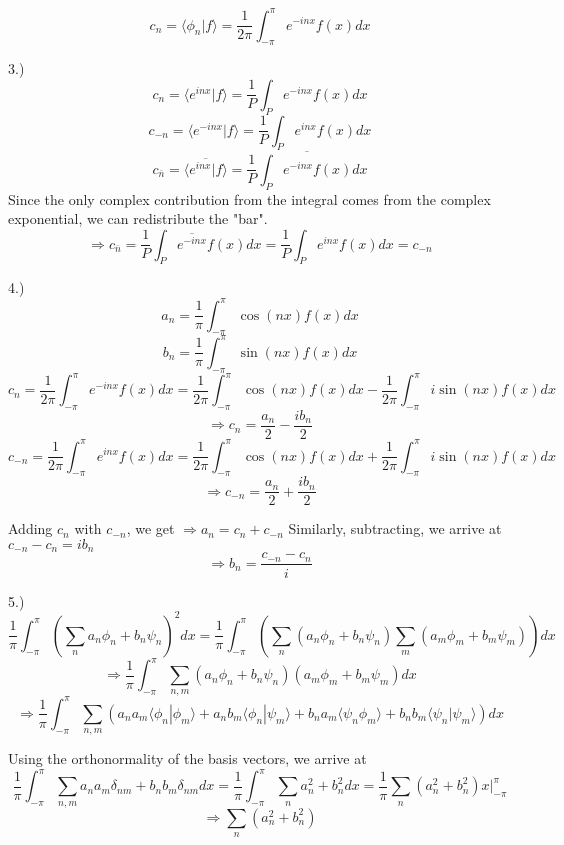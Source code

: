 \documentclass[12pt]{article}
\begin{document}
$$c_n = \langle \phi_n | f \rangle = \frac{1}{2\pi} \int_{-\pi}^{\pi} e^{-inx} f(x) dx$$
\pagebreak

3.)
$$c_n = \langle e^{inx} | f \rangle = \frac{1}{P} \int_P e^{-inx} f(x) dx$$
$$c_{-n} = \langle e^{-inx} | f \rangle = \frac{1}{P} \int_P e^{inx} f(x) dx$$
$$c_{\bar{n}} = \overline{\langle e^{inx} | f \rangle} = \overline{\frac{1}{P} \int_P e^{-inx} f(x) dx}$$
Since the only complex contribution from the integral comes from the complex exponential, we can redistribute the "bar".
$$\Rightarrow c_{\bar n} = \frac{1}{P} \int_{P} \overline{e^{-inx}} f(x) dx = \frac{1}{P} \int_P e^{inx} f(x) dx = c_{-n}$$
\pagebreak

4.) 
$$a_n = \frac{1}{\pi} \int_{-\pi}^{\pi} \cos(nx) f(x) dx$$
$$b_n = \frac{1}{\pi} \int_{-\pi}^{\pi} \sin(nx) f(x) dx$$
$$c_n = \frac{1}{2\pi} \int_{-\pi}^{\pi} e^{-inx} f(x) dx = \frac{1}{2\pi}\int_{-\pi}^{\pi} \cos(nx) f(x) dx - \frac{1}{2\pi} \int_{-\pi}^{\pi} i \sin(nx) f(x) dx$$
$$\Rightarrow c_n = \frac{a_n}{2} - \frac{i b_n}{2}$$
$$c_{-n} = \frac{1}{2\pi} \int_{-\pi}^{\pi} e^{inx} f(x) dx = \frac{1}{2\pi}\int_{-\pi}^{\pi} \cos(nx) f(x) dx + \frac{1}{2\pi} \int_{-\pi}^{\pi} i \sin(nx) f(x) dx$$
$$\Rightarrow c_{-n} = \frac{a_n}{2} + \frac{i b_n}{2}$$

Adding $c_n$ with $c_{-n}$, we get $\Rightarrow a_n = c_n + c_{-n}$
Similarly, subtracting, we arrive at $c_{-n} - c_n = ib_n$
$$\Rightarrow b_n = \frac{c_{-n} - c_n}{i}$$

\pagebreak

5.) 
$$\frac{1}{\pi}\int_{-\pi}^{\pi}(\sum_n a_n \phi_n + b_n \psi_n)^2 dx = \frac{1}{\pi} \int_{-\pi}^{\pi} (\sum_n (a_n \phi_n + b_n \psi_n) \sum_m (a_m \phi_m + b_m \psi_m)) dx$$
$$\Rightarrow \frac{1}{\pi} \int_{-\pi}^{\pi} \sum_{n, m} (a_n \phi_n + b_n \psi_n) (a_m \phi_m + b_m \psi_m) dx $$
$$\Rightarrow \frac{1}{\pi} \int_{-\pi}^{\pi} \sum_{n, m} (a_n a_m \langle \phi_n | \phi_m \rangle + a_n b_m \langle \phi_n | \psi_m \rangle + b_n a_m \langle \psi_n \phi_m \rangle + b_n b_m \langle \psi_n | \psi_m \rangle)dx $$

Using the orthonormality of the basis vectors, we arrive at
$$\frac{1}{\pi} \int_{-\pi}^{\pi} \sum_{n, m} a_n a_m \delta_{nm} + b_n b_m \delta_{nm} dx = \frac{1}{\pi} \int_{-\pi}^{\pi} \sum_n a_n^2 + b_n^2 dx = \frac{1}{\pi} \sum_n (a_n^2 + b_n^2)x \Big|_{-\pi}^{\pi}$$
$$\Rightarrow \sum_n (a_n^2 + b_n^2)$$
\end{document}
